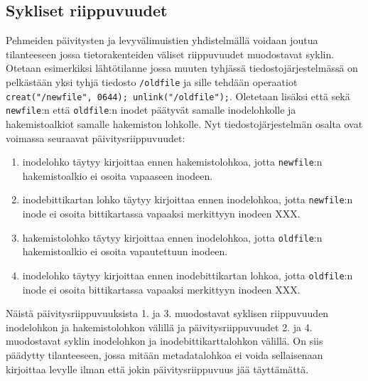 
\subsection{Sykliset riippuvuudet}
Pehmeiden päivitysten ja levyvälimuistien yhdistelmällä voidaan joutua tilanteeseen jossa tietorakenteiden väliset riippuvuudet muodostavat syklin.
Otetaan esimerkiksi lähtötilanne jossa muuten tyhjässä tiedostojärjestelmässä on pelkästään yksi tyhjä tiedosto \texttt{/oldfile} ja sille tehdään operaatiot \texttt{creat("/newfile", 0644); unlink("/oldfile");}.
Oletetaan lisäksi että sekä \texttt{newfile}:n että \texttt{oldfile}:n inodet päätyvät samalle inodelohkolle ja hakemistoalkiot samalle hakemiston lohkolle.
Nyt tiedostojärjestelmän osalta ovat voimassa seuraavat päivitysriippuvuudet:
\begin{enumerate}
    \item{inodelohko täytyy kirjoittaa ennen hakemistolohkoa, jotta \texttt{newfile}:n hakemistoalkio ei osoita vapaaseen inodeen.}
    \item{inodebittikartan lohko täytyy kirjoittaa ennen inodelohkoa, jotta \texttt{newfile}:n inode ei osoita bittikartassa vapaaksi merkittyyn inodeen XXX.}
    \item{hakemistolohko täytyy kirjoittaa ennen inodelohkoa, jotta \texttt{oldfile}:n hakemistoalkio ei osoita vapautettuun inodeen.}
    \item{inodelohko täytyy kirjoittaa ennen inodebittikartan lohkoa, jotta \texttt{oldfile}:n inode ei osoita bittikartassa vapaaksi merkittyyn inodeen XXX.}
\end{enumerate}
Näistä päivitysriippuvuuksista 1. ja 3. muodostavat syklisen riippuvuuden inodelohkon ja hakemistolohkon välillä ja päivitysriippuvuudet 2. ja 4. muodostavat syklin inodelohkon ja inodebittikarttalohkon välillä.
On siis päädytty tilanteeseen, jossa mitään metadatalohkoa ei voida sellaisenaan kirjoittaa levylle ilman että jokin päivitysriippuvuus jää täyttämättä.

